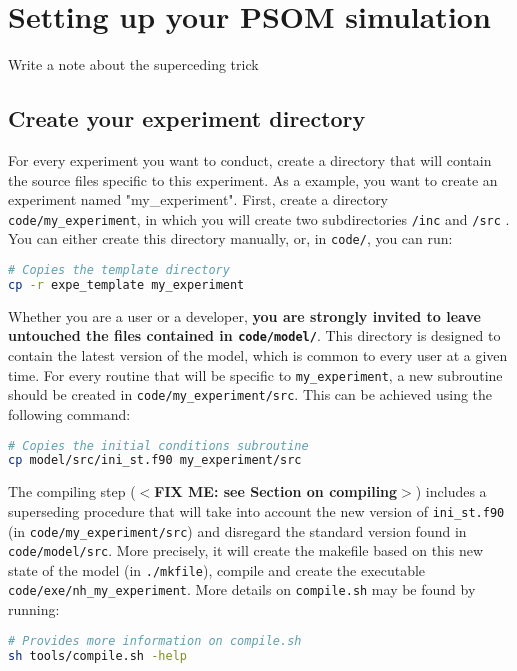 \documentclass[12pt,letterpaper,titlepage]{article}
\newcommand{\fixme}[1]{\color{red}$<$\textbf{FIX ME: #1}$>$\color{black}}
\begin{document}
\section{Setting up your PSOM simulation}

Write a note about the superceding trick

\subsection{Create your experiment directory}
For every experiment you want to conduct, create a directory that will contain the source files specific to this experiment. As a example, you want to create an experiment named "my\_experiment". First, create a directory \texttt{code/my\_experiment}, in which you will create two subdirectories \texttt{/inc} and \texttt{/src} . You can either create this directory manually, or, in \texttt{code/}, you can run:

\begin{lstlisting}[language=sh]
# Copies the template directory
cp -r expe_template my_experiment
\end{lstlisting}
Whether you are a user or a developer, \textbf{you are strongly invited to leave untouched the files contained in \texttt{code/model/}}. This directory is designed to contain the latest version of the model, which is common to every user at a given time. For every routine that will be specific to \texttt{my\_experiment}, a new subroutine should be created in \texttt{code/my\_experiment/src}. This can be achieved using the following command:
\begin{lstlisting}[language=sh]
# Copies the initial conditions subroutine
cp model/src/ini_st.f90 my_experiment/src
\end{lstlisting}
The compiling step (\fixme{see Section on compiling}) includes a superseding procedure that will take into account the new version of \texttt{ini\_st.f90} (in \texttt{code/my\_experiment/src}) and disregard the standard version found in \texttt{code/model/src}. More precisely, it will create the makefile based on this new state of the model (in \texttt{./mkfile}), compile and create the executable \texttt{code/exe/nh\_my\_experiment}. More details on \texttt{compile.sh} may be found by running:

\begin{lstlisting}[language=sh]
# Provides more information on compile.sh
sh tools/compile.sh -help
\end{lstlisting}
\end{document}
